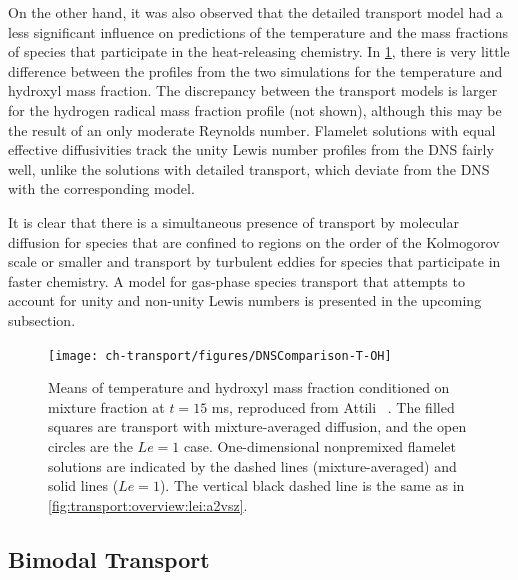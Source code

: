 On the other hand, it was also observed that the detailed transport model had a less significant influence on predictions of the temperature and the mass fractions of species that participate in the heat-releasing chemistry. In \cref{fig:transport:overview:lei:tvsz}, there is very little difference between the profiles from the two simulations for the temperature and hydroxyl mass fraction. The discrepancy between the transport models is larger for the hydrogen radical mass fraction profile (not shown), although this may be the result of an only moderate Reynolds number. Flamelet solutions with equal effective diffusivities track the unity Lewis number profiles from the DNS fairly well, unlike the solutions with detailed transport, which deviate from the DNS with the corresponding model.

It is clear that there is a simultaneous presence of transport by molecular diffusion for species that are confined to regions on the order of the Kolmogorov scale or smaller and transport by turbulent eddies for species that participate in faster chemistry. A model for gas-phase species transport that attempts to account for unity and non-unity Lewis numbers is presented in the upcoming subsection.

\begin{figure}[htb]
  \centering
  \texttt{[image: ch-transport/figures/DNSComparison-T-OH]}
  \caption[DNS Results with $Le = 1$ and $Le \neq 1$, $\langle T|Z \rangle$, and $\langle Y_{\ce{OH}}|Z \rangle$ vs. $Z$]{Means of temperature and hydroxyl mass fraction conditioned on mixture fraction at $t = 15$ ms, reproduced from Attili \etal~\cite{attili2016}. The filled squares are transport with mixture-averaged diffusion, and the open circles are the $Le = 1$ case. One-dimensional nonpremixed flamelet solutions are indicated by the dashed lines (mixture-averaged) and solid lines ($Le = 1$). The vertical black dashed line is the same as in \cref{fig:transport:overview:lei:a2vsz}.}
  \label{fig:transport:overview:lei:tvsz}
\end{figure}


\subsection{Bimodal Transport}
\label{sec:transport:overview:bimodal}

